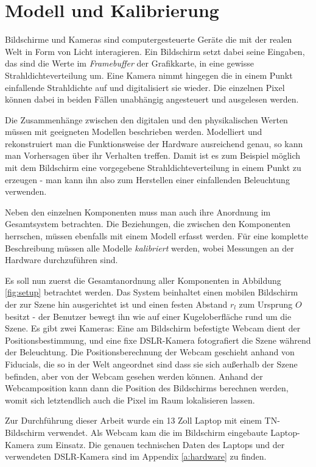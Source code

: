 \chapter{Modell und Kalibrierung}  \label{kalibrierung}

  Bildschirme und Kameras sind computergesteuerte Geräte die mit der realen Welt in Form von Licht interagieren.
  Ein Bildschirm setzt dabei seine Eingaben, das sind die Werte im \emph{Framebuffer} der Grafikkarte, in eine gewisse Strahldichteverteilung um.  
  Eine Kamera nimmt hingegen die in einem Punkt einfallende Strahldichte auf und digitalisiert sie wieder.
  Die einzelnen Pixel können dabei in beiden Fällen unabhängig angesteuert und ausgelesen werden.

  Die Zusammenhänge zwischen den digitalen und den physikalischen Werten müssen mit geeigneten Modellen beschrieben werden.
  Modelliert und rekonstruiert man die Funktionsweise der Hardware ausreichend genau, so kann man Vorhersagen über ihr Verhalten treffen.
  Damit ist es zum Beispiel möglich mit dem Bildschirm eine vorgegebene Strahldichteverteilung in einem Punkt zu erzeugen - 
  man kann ihn also zum Herstellen einer einfallenden Beleuchtung verwenden.
 
  Neben den einzelnen Komponenten muss man auch ihre Anordnung im Gesamtsystem betrachten.
  Die Beziehungen, die zwischen den Komponenten herrschen, müssen ebenfalls mit einem Modell erfasst werden.
  Für eine komplette Beschreibung müssen alle Modelle \emph{kalibriert} werden, wobei Messungen an der Hardware durchzuführen sind.
  
  Es soll nun zuerst die Gesamtanordnung aller Komponenten in Abbildung \ref{fig:setup} betrachtet werden. 
  Das System beinhaltet einen mobilen Bildschirm der zur Szene hin ausgerichtet ist und einen festen Abstand $r_l$ zum Ursprung $O$ besitzt - der Benutzer bewegt ihn wie auf einer Kugeloberfläche  rund um die Szene.
  Es gibt zwei Kameras: Eine am Bildschirm befestigte Webcam dient der Positionsbestimmung, und eine fixe DSLR-Kamera fotografiert die Szene während der Beleuchtung.
  Die Positionsberechnung der Webcam geschieht anhand von Fiducials, die so in der Welt angeordnet sind dass sie sich außerhalb der Szene befinden, aber von der Webcam gesehen werden können.
  Anhand der Webcamposition kann dann die Position des Bildschirms berechnen werden, womit sich letztendlich auch die Pixel im Raum lokalisieren lassen.
  
  Zur Durchführung dieser Arbeit wurde ein 13 Zoll Laptop mit einem TN-Bildschirm verwendet. 
  Als Webcam kam die im Bildschirm eingebaute Laptop-Kamera zum Einsatz. 
  Die genauen technischen Daten des Laptops und der verwendeten DSLR-Kamera sind im Appendix \ref{a:hardware} zu finden.

